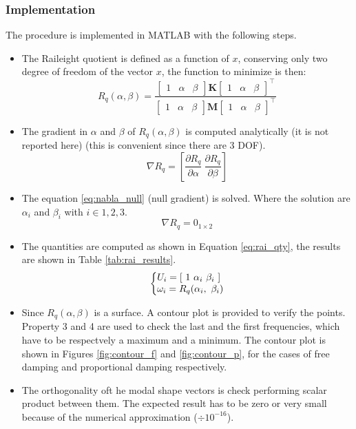 \documentclass[twosided,a4paper]{article}           %
\makeatletter
\newcommand{\tr}{^{{\bm \top}}}
\newenvironment{sistema}%
{\left\lbrace\begin{array}{@{}l@{}}}%
	{\end{array}\right.}
\makeatother
\begin{document}
\subsubsection{Implementation}
The procedure is implemented in MATLAB with the following steps.
\begin{itemize}
	\item The Raileight quotient is defined as a function of $x$, conserving only two degree of freedom of the vector $x$, the function to minimize is then:
	\begin{equation}
		R_q(\alpha,\beta) = \dfrac{\begin{bmatrix} 1 & \alpha & \beta \end{bmatrix}   \bm{K}
		                    \begin{bmatrix} 1 & \alpha & \beta \end{bmatrix} \tr}{\begin{bmatrix} 1 & \alpha & \beta \end{bmatrix} \bm{M}
		                    \begin{bmatrix} 1 & \alpha & \beta \end{bmatrix} \tr}
	\end{equation}
	\item The gradient in $\alpha$ and $\beta$ of $R_q(\alpha,\beta)$ is computed analytically (it is not reported here)  (this is convenient since there are 3 DOF).
	\begin{equation}
		\nabla R_q = \left [ \dfrac{\partial R_q}{\partial \alpha} \ \dfrac{\partial R_q}{\partial \beta} \right ]
	\end{equation}
	\item The equation \eqref{eq:nabla_null} (null gradient) is solved. Where the solution are $\alpha_i$ and $\beta_i$ with $i \in 1,2,3$. 
	\begin{equation}
	\label{eq:nabla_null}
		\nabla R_q = 0_{1 \times 2}
	\end{equation}
	\item The quantities are computed as shown in Equation \eqref{eq:rai_qty}, the results are shown in Table \ref{tab:rai_results}.
	\begin{equation}
	\label{eq:rai_qty}
		\begin{sistema}
		U_i = \left [ \ 1 \ \alpha_i \ \beta_i \ \right ]\\
		\omega_i = R_q(\alpha_i, \ \beta_i)
		\end{sistema}
	\end{equation}
	\item Since $R_q(\alpha,\beta)$ is a surface. A contour plot is provided to verify the points. Property 3 and 4 are used to check the last and the first frequencies, which have to be respectvely a maximum and a minimum. The contour plot is shown in Figures \ref{fig:contour_f} and \ref{fig:contour_p}, for the cases of free damping and proportional damping respectively.
	\item The orthogonality oft he modal shape vectors is check performing scalar product between them. The expected result has to be zero or very small because of the numerical approximation ($\div 10^{-16}$).
\end{itemize}
\end{document}
